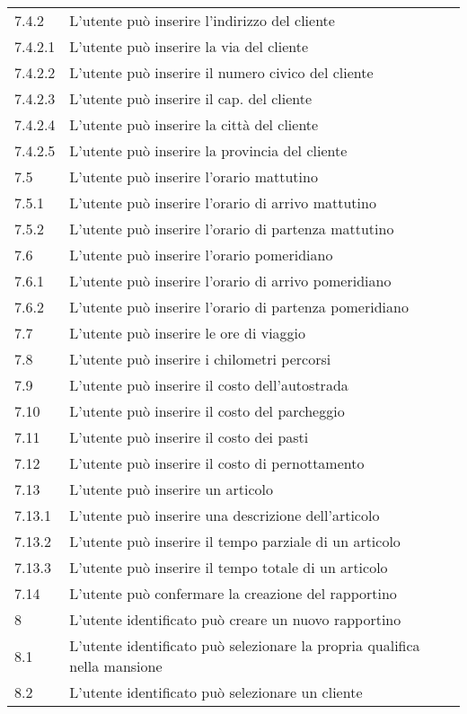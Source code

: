 \begin{longtable}{||p{} p{10.55cm}||}
		7.4.2 & L’utente può inserire l’indirizzo del cliente\\
		7.4.2.1 & L’utente può inserire la via del cliente\\
		7.4.2.2 & L’utente può inserire il numero civico del cliente\\
		7.4.2.3 & L’utente può inserire il cap. del cliente \\
		7.4.2.4 & L’utente può inserire la città del cliente\\
		7.4.2.5 & L’utente può inserire la provincia del cliente\\
		7.5 & L’utente può inserire l’orario mattutino\\
		7.5.1 & L’utente può inserire l’orario di arrivo mattutino\\
		7.5.2 & L’utente può inserire l’orario di partenza mattutino\\
		7.6 & L’utente può inserire l’orario pomeridiano\\
		7.6.1 & L’utente può inserire l’orario di arrivo pomeridiano\\
		7.6.2 & L’utente può inserire l’orario di partenza pomeridiano\\
		7.7 & L’utente può inserire le ore di viaggio\\
		7.8 & L’utente può inserire i chilometri percorsi\\
		7.9 & L’utente può inserire il costo dell’autostrada\\
		7.10 & L’utente può inserire il costo del parcheggio\\
		7.11 & L’utente può inserire il costo dei pasti\\
		7.12 & L’utente può inserire il costo di pernottamento\\
		7.13 & L’utente può inserire un articolo\\
		7.13.1 & L’utente può inserire una descrizione dell’articolo\\
		7.13.2 & L’utente può inserire il tempo parziale di un articolo\\
		7.13.3 & L’utente può inserire il tempo totale di un articolo\\
		7.14 & L’utente può confermare la creazione del rapportino\\
		\hline
		8 & L’utente identificato può creare un nuovo rapportino\\
		8.1 & L’utente identificato può selezionare la propria qualifica nella mansione\\
		8.2 & L’utente identificato può selezionare un cliente\\

\end{longtable}

